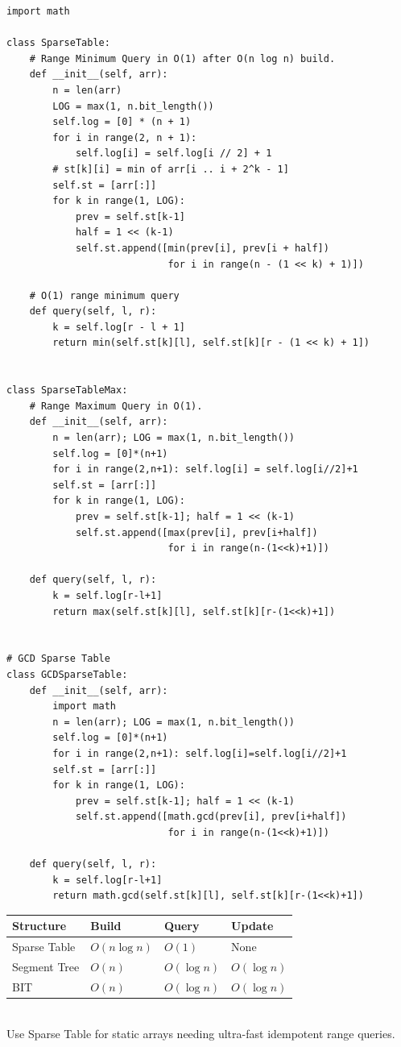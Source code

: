 \documentclass[11pt,a4paper]{report}
\begin{document}
\begin{lstlisting}
import math

class SparseTable:
    # Range Minimum Query in O(1) after O(n log n) build.
    def __init__(self, arr):
        n = len(arr)
        LOG = max(1, n.bit_length())
        self.log = [0] * (n + 1)
        for i in range(2, n + 1):
            self.log[i] = self.log[i // 2] + 1
        # st[k][i] = min of arr[i .. i + 2^k - 1]
        self.st = [arr[:]]
        for k in range(1, LOG):
            prev = self.st[k-1]
            half = 1 << (k-1)
            self.st.append([min(prev[i], prev[i + half])
                            for i in range(n - (1 << k) + 1)])

    # O(1) range minimum query
    def query(self, l, r):
        k = self.log[r - l + 1]
        return min(self.st[k][l], self.st[k][r - (1 << k) + 1])


class SparseTableMax:
    # Range Maximum Query in O(1).
    def __init__(self, arr):
        n = len(arr); LOG = max(1, n.bit_length())
        self.log = [0]*(n+1)
        for i in range(2,n+1): self.log[i] = self.log[i//2]+1
        self.st = [arr[:]]
        for k in range(1, LOG):
            prev = self.st[k-1]; half = 1 << (k-1)
            self.st.append([max(prev[i], prev[i+half])
                            for i in range(n-(1<<k)+1)])

    def query(self, l, r):
        k = self.log[r-l+1]
        return max(self.st[k][l], self.st[k][r-(1<<k)+1])


# GCD Sparse Table
class GCDSparseTable:
    def __init__(self, arr):
        import math
        n = len(arr); LOG = max(1, n.bit_length())
        self.log = [0]*(n+1)
        for i in range(2,n+1): self.log[i]=self.log[i//2]+1
        self.st = [arr[:]]
        for k in range(1, LOG):
            prev = self.st[k-1]; half = 1 << (k-1)
            self.st.append([math.gcd(prev[i], prev[i+half])
                            for i in range(n-(1<<k)+1)])

    def query(self, l, r):
        k = self.log[r-l+1]
        return math.gcd(self.st[k][l], self.st[k][r-(1<<k)+1])
\end{lstlisting}

\begin{compbox}
\begin{tabular}{@{}llll@{}}
\toprule
\textbf{Structure} & \textbf{Build} & \textbf{Query} & \textbf{Update} \\
\midrule
Sparse Table     & $O(n \log n)$ & $O(1)$        & None \\
Segment Tree     & $O(n)$        & $O(\log n)$   & $O(\log n)$ \\
BIT              & $O(n)$        & $O(\log n)$   & $O(\log n)$ \\
\bottomrule
\end{tabular}\\[4pt]
Use Sparse Table for static arrays needing ultra-fast idempotent range queries.
\end{compbox}
\end{document}
